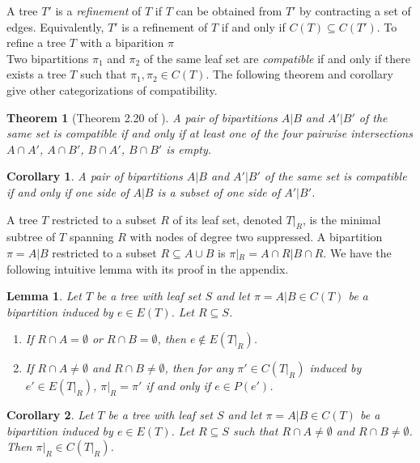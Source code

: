 \documentclass{bmcart}
\newtheorem{theorem}{Theorem}
\newtheorem{lemma}{Lemma}
\newtheorem{corollary}{Corollary}
\begin{document}
A tree $T'$ is a \textit{refinement} of $T$ if $T$ can be obtained from $T'$ by contracting a set of edges. Equivalently, $T'$ is a refinement of $T$ if and only if $C(T) \subseteq C(T')$. To refine a tree $T$ with a biparition $\pi$ \\

Two bipartitions $\pi_1$ and $\pi_2$ of the same leaf set are \textit{compatible} if and only if there exists a tree $T$ such that $\pi_1, \pi_2 \in C(T)$. The following theorem and corollary give other categorizations of compatibility.
\begin{theorem}[Theorem 2.20 of \cite{warnow2017computational}]\label{thm:compatibility}
    A pair of bipartitions $A|B$ and $A'|B'$ of the same set is compatible if and only if at least one of the four pairwise intersections $A \cap A'$, $A\cap B'$, $B\cap A'$, $B \cap B'$ is empty. 
\end{theorem}

\begin{corollary}\label{cor:compatibility}
     A pair of bipartitions $A|B$ and $A'|B'$ of the same set is compatible if and only if one side of $A|B$ is a subset of one side of $A'|B'$.
\end{corollary}
\medskip

A tree $T$ restricted to a subset $R$ of its leaf set, denoted $T|_R$, is the minimal subtree of $T$ spanning $R$ with nodes of degree two suppressed. A bipartition $\pi = A|B$ restricted to a subset $R \subseteq A\cup B$ is $\pi|_R = A\cap R | B\cap R$. We have the following intuitive lemma with its proof in the appendix.

\begin{lemma} \label{lem:bipar_restrict_edge}
    Let $T$ be a tree with leaf set $S$ and let $\pi = A|B \in C(T)$ be a bipartition induced by $e \in E(T)$. Let $R \subseteq S$.
    \begin{enumerate}
        \item If $R \cap A = \emptyset$ or $R \cap B = \emptyset$, then $e \notin E(T|_R)$.
        \item If $R \cap A \neq \emptyset$ and $R \cap B \neq \emptyset$, then for any $\pi' \in C(T|_R)$ induced by $e' \in E(T|_R)$, $\pi|_R = \pi'$ if and only if $e \in P(e')$.
    \end{enumerate}
\end{lemma}

\begin{corollary} \label{cor:bipar_restrict}
    Let $T$ be a tree with leaf set $S$ and let $\pi = A|B \in C(T)$ be a bipartition induced by $e \in E(T)$. Let $R \subseteq S$ such that $R \cap A \neq \emptyset$ and $R \cap B \neq \emptyset$. Then $\pi|_R \in C(T|_R)$. 
\end{corollary}
\end{document}
